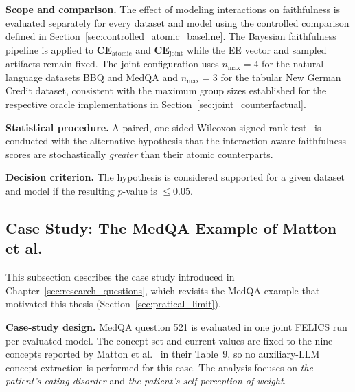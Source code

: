 \noindent\textbf{Scope and comparison.} The effect of modeling interactions on faithfulness is evaluated separately for every dataset and model using the controlled comparison defined in Section~\ref{sec:controlled_atomic_baseline}. The Bayesian faithfulness pipeline is applied to $\mathbf{CE}_{\mathrm{atomic}}$ and $\mathbf{CE}_{\mathrm{joint}}$ while the EE vector and sampled artifacts remain fixed. The joint configuration uses $n_{\max}=4$ for the natural-language datasets BBQ and MedQA and $n_{\max}=3$ for the tabular New German Credit dataset, consistent with the maximum group sizes established for the respective oracle implementations in Section~\ref{sec:joint_counterfactual}.

\noindent\textbf{Statistical procedure.} A paired, one-sided Wilcoxon signed-rank test~\cite{wilcoxonIndividualComparisonsRanking1945} is conducted with the alternative hypothesis that the interaction-aware faithfulness scores are stochastically \emph{greater} than their atomic counterparts.

\noindent\textbf{Decision criterion.} The hypothesis is considered supported for a given dataset and model if the resulting $p$-value is $\le 0.05$.

\subsection{Case Study: The MedQA Example of Matton et al.}
\label{sec:motivating_methodology}
This subsection describes the case study introduced in Chapter~\ref{sec:research_questions}, which revisits the MedQA example that motivated this thesis (Section~\ref{sec:pratical_limit}).

\noindent\textbf{Case-study design.} MedQA question 521 is evaluated in one joint FELICS run per evaluated model. The concept set and current values are fixed to the nine concepts reported by Matton et al.~\cite{mattonWalkTalkMeasuring2024} in their Table~9, so no auxiliary-LLM concept extraction is performed for this case. The analysis focuses on \textit{the patient's eating disorder} and \textit{the patient's self-perception of weight}.

